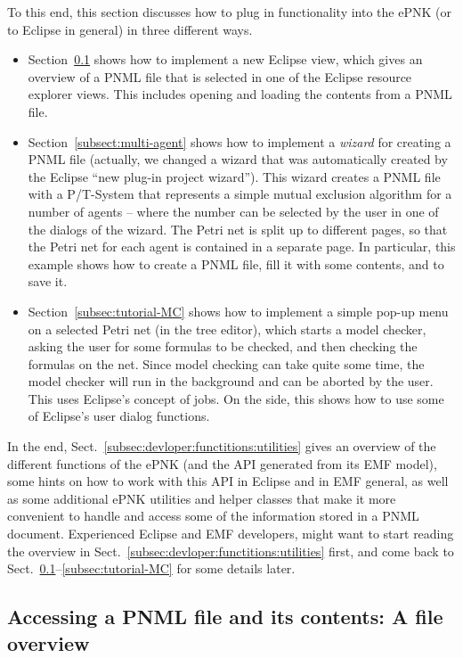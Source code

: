 To this end, this section discusses how to plug in functionality into
the ePNK (or to Eclipse in general) in three different ways.
\begin{itemize}
\item Section~\ref{subsec:file-overview} shows how to implement a new
Eclipse view, which gives an overview of a PNML file that is selected in one of
the Eclipse resource explorer views. This includes opening and loading the
contents from a PNML file.

\item Section~\ref{subsect:multi-agent} shows how to implement a \emph{wizard}
for creating a PNML file (actually, we changed a wizard that was
automatically created by the Eclipse ``new plug-in project wizard'').
This wizard creates a PNML file with a P/T-System that represents
a simple mutual exclusion algorithm for a number of agents -- where the
number can be selected by the user in one of the dialogs of the wizard.
The Petri net is split up to different pages, so that the Petri net for each
agent is contained in a separate page. In particular, this example
shows how to create a PNML file, fill it with some contents, and to save it.

\item Section~\ref{subsec:tutorial-MC} shows how to implement a
simple pop-up menu on a selected Petri net (in the tree editor), which
starts a model checker, asking the user for some formulas to be checked,
and then checking the formulas on the net. Since model checking can take
quite some time, the model checker will run in the background and can
be aborted by the user. This uses Eclipse's concept of jobs. On the side, this
shows how to use some of Eclipse's user dialog functions.
\end{itemize}

In the end, Sect.~\ref{subsec:devloper:functitions:utilities} gives an overview
of the different functions of the ePNK (and the API generated from its EMF
model), some hints on how to work with this API in Eclipse and in EMF
general, as well as some additional ePNK utilities and helper classes that make it more
convenient to handle and access some of the information stored in a PNML document.
Experienced Eclipse and EMF developers, might want to start reading the overview
in Sect.~\ref{subsec:devloper:functitions:utilities} first, and come back
to Sect.~\ref{subsec:file-overview}--\ref{subsec:tutorial-MC} for some details
later.

\subsection{Accessing a PNML file and its contents: A file overview}
\label{subsec:file-overview}

